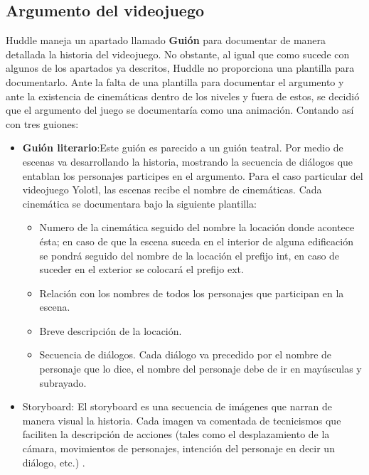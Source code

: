 \subsection{Argumento del videojuego}
Huddle maneja un apartado llamado \textbf{Guión} para documentar de manera detallada 
la historia del videojuego. No obstante, al igual que como sucede con algunos de 
los apartados ya descritos, Huddle no proporciona una plantilla para documentarlo. 
Ante la falta de una plantilla para documentar el argumento y ante la existencia 
de cinemáticas dentro de los niveles y fuera de estos, se decidió que el argumento 
del juego se documentaría como una animación. Contando así con tres guiones:
	\begin{itemize}
		\item \textbf{Guión literario}:Este guión es parecido a un guión teatral. 
		Por medio de escenas va desarrollando la historia, mostrando la secuencia 
		de diálogos que entablan los personajes participes en el argumento. Para 
		el caso particular del videojuego Yolotl, las escenas recibe el nombre de 
		cinemáticas. Cada cinemática se documentara bajo la siguiente plantilla:
			\begin{itemize}
				\item Numero de la cinemática seguido del nombre la locación donde 
				acontece ésta; en caso de que la escena suceda en el interior de 
				alguna edificación se pondrá seguido del nombre de la locación el 
				prefijo int, en caso de suceder en el exterior se colocará el 
				prefijo ext.
				\item Relación con los nombres de todos los personajes que participan 
				en la escena.
				\item Breve descripción de la locación.
				\item Secuencia de diálogos. Cada diálogo va precedido por el nombre 
				de personaje que lo dice, el nombre del personaje debe de ir en 
				mayúsculas y subrayado. 
			\end{itemize}
			\item Storyboard: El storyboard es una secuencia de imágenes que narran 
			de manera visual la historia. Cada imagen va comentada de tecnicismos 
			que faciliten la descripción de acciones (tales como el desplazamiento 
			de la cámara, movimientos de personajes, intención del personaje en 
			decir un diálogo, etc.) \cite{RefStoyBoard}.  			 
	\end{itemize}